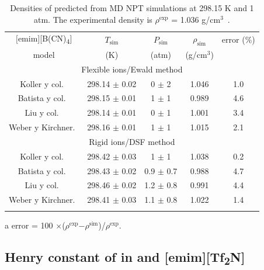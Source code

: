 \documentclass[3p,twocolumn]{elsarticle}
\begin{document}
\begin{table}
\caption{Densities of \ce{[emim][B(CN)_4]} predicted from MD NPT simulations at 298.15 K and 1 atm. The experimental density is $\rho^{\text{exp}}$ = 1.036 g/cm$^{3}$~\cite{Doma_ska_2011}.}
\begin{threeparttable}
\begin{tabular}{ c  c  c  c  c}  
\hline \hline
$\text{[emim]}$[B(CN)\textsubscript{4}] & $T_{\text{sim}}$ & $ P_{\text{sim}} $ & $\rho_{\text{sim}}$ & error (\%)\tnote{a} \\
model & (K) &  (atm) &  (g/cm$^{3}$) &  \\
			\hline
		 \multicolumn{5}{c}{Flexible ions/Ewald method}\\

Koller y col.~\cite{Koller_2012}  & 298.14 $\pm$  0.02 & 0 $\pm$ 2 & 1.046 & 1.0 \\
Batista y col.~\cite{Batista_2015} & 298.15 $\pm$ 0.01  & 1 $\pm$ 1 & 0.989 & 4.6  \\
Liu y col.~\cite{Liu_2014}  & 298.14 $\pm$ 0.01 & 0 $\pm$ 1 & 1.001 & 3.4  \\
Weber y Kirchner.~\cite{Weber_2016}  & 298.16  $\pm$ 0.01 & 1 $\pm$ 1 & 1.015 & 2.1  \\
	 \multicolumn{5}{c}{Rigid ions/DSF method}\\
Koller y col.~\cite{Koller_2012}   & 298.42  $\pm$ 0.03  & 1 $\pm$ 1 & 1.038 & 0.2 \\
Batista y col.~\cite{Batista_2015} & 298.43 $\pm$ 0.02  & 0.9 $\pm$ 0.7  & 0.988 & 4.7  \\
Liu y col.~\cite{Liu_2014}  & 298.46 $\pm$ 0.02 & 1.2  $\pm$ 0.8 & 0.991 &  4.4 \\
Weber y Kirchner.~\cite{Weber_2016} &  298.41 $\pm$ 0.03 & 1.1 $\pm$ 0.8 & 1.022 & 1.4  \\
 \hline \hline
\label{table:props_dsf} 
\end{tabular}
\begin{tablenotes}
\item[a] error = 100 $\times$($\rho^{\text{exp}}$$ - $$\rho^{\text{sim}}$)/$\rho^{\text{exp}}$.
\end{tablenotes}
\end{threeparttable}
\end{table}

\subsection{Henry constant of  in \ce{[emim][B(CN)_4]} and [emim][Tf\textsubscript{2}N]}
\label{sec:henry_results}
\end{document}

